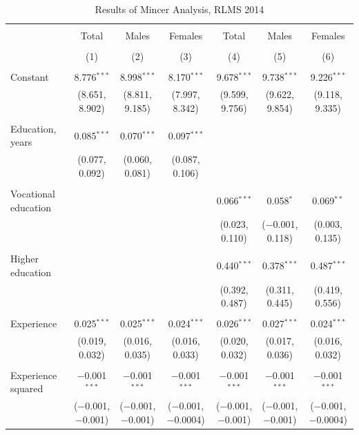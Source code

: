 \documentclass[12pt,a4paper]{article}
\numberwithin{equation}{section}
\begin{document}
\begin{landscape}
	
	\fontsize{9}{11}
	\selectfont
	
	\begin{table}[!htbp] \centering 
		\caption{Results of Mincer Analysis, RLMS 2014} 
		\label{} 
		\begin{tabular}{@{\extracolsep{5pt}}lcccccc} 
			\\[-1.8ex]\hline 
			\hline \\[-1.8ex] 
			& Total & Males & Females & Total & Males & Females \\ 
			\\[-1.8ex] & (1) & (2) & (3) & (4) & (5) & (6)\\ 
			\hline \\[-1.8ex] 
			Constant & 8.776$^{***}$ & 8.998$^{***}$ & 8.170$^{***}$ & 9.678$^{***}$ & 9.738$^{***}$ & 9.226$^{***}$ \\ 
			& (8.651, 8.902) & (8.811, 9.185) & (7.997, 8.342) & (9.599, 9.756) & (9.622, 9.854) & (9.118, 9.335) \\ 
			& & & & & & \\ 
			Education, years & 0.085$^{***}$ & 0.070$^{***}$ & 0.097$^{***}$ &  &  &  \\ 
			& (0.077, 0.092) & (0.060, 0.081) & (0.087, 0.106) &  &  &  \\ 
			& & & & & & \\ 
			Vocational education &  &  &  & 0.066$^{***}$ & 0.058$^{*}$ & 0.069$^{**}$ \\ 
			&  &  &  & (0.023, 0.110) & ($-$0.001, 0.118) & (0.003, 0.135) \\ 
			& & & & & & \\ 
			Higher education &  &  &  & 0.440$^{***}$ & 0.378$^{***}$ & 0.487$^{***}$ \\ 
			&  &  &  & (0.392, 0.487) & (0.311, 0.445) & (0.419, 0.556) \\ 
			& & & & & & \\ 
			Experience & 0.025$^{***}$ & 0.025$^{***}$ & 0.024$^{***}$ & 0.026$^{***}$ & 0.027$^{***}$ & 0.024$^{***}$ \\ 
			& (0.019, 0.032) & (0.016, 0.035) & (0.016, 0.033) & (0.020, 0.032) & (0.017, 0.036) & (0.016, 0.032) \\ 
			& & & & & & \\ 
			Experience squared & $-$0.001$^{***}$ & $-$0.001$^{***}$ & $-$0.001$^{***}$ & $-$0.001$^{***}$ & $-$0.001$^{***}$ & $-$0.001$^{***}$ \\ 
			& ($-$0.001, $-$0.001) & ($-$0.001, $-$0.001) & ($-$0.001, $-$0.0004) & ($-$0.001, $-$0.001) & ($-$0.001, $-$0.001) & ($-$0.001, $-$0.0004) \\ 

\end{tabular}
\end{table}
\end{landscape}
\end{document}
